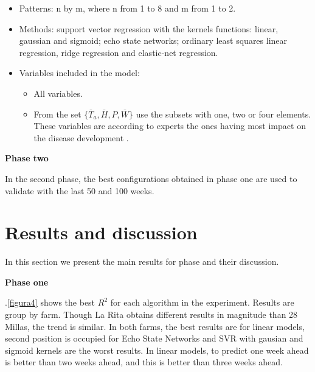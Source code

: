 \documentclass[review,authoryear,english]{elsarticle}
\begin{document}
\begin{itemize}
\item 	Patterns: n by m, where n from 1 to 8 and m from 1 to 2.

\item Methods: support vector regression with the kernels functions: linear, gaussian and sigmoid; echo state networks; ordinary least squares linear regression, ridge regression and elastic-net regression.

\item Variables included in the model:
\begin{itemize}
\item All variables.
\item From the set $\{ \overline{T}_{a} , \overline{H}, P , \overline{W}  \}$ use the subsets with one, two or four elements. These variables are according to experts the ones having most impact on the disease development \citep{MarinVargas1995}.
\end{itemize}

\end{itemize}

{\bf Phase two }	

In the second phase, the best configurations obtained in phase one are used to validate with the last 50 and 100 weeks. 

\section{Results and discussion}
\label{sec:results}

In this section we present the main results for phase and their discussion.

{\bf Phase one } 

\figurename $.$\ref{figura4} shows the best $R^2$ for each algorithm in the experiment. Results are group by farm. Though La Rita obtains different results in magnitude than 28 Millas, the trend is similar. In both farms, the best results are for linear models, second position is occupied for Echo State Networks and  SVR with gausian and sigmoid kernels are the worst results. In linear models, to predict one week ahead is better than two weeks ahead, and this is better than three weeks ahead. 
\end{document}

